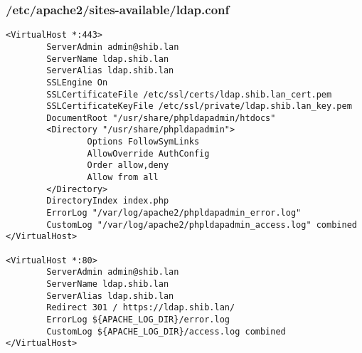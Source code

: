 \subsubsection{/etc/apache2/sites-available/ldap.conf}
\begin{lstlisting}
<VirtualHost *:443>
        ServerAdmin admin@shib.lan
        ServerName ldap.shib.lan
        ServerAlias ldap.shib.lan
        SSLEngine On
        SSLCertificateFile /etc/ssl/certs/ldap.shib.lan_cert.pem
        SSLCertificateKeyFile /etc/ssl/private/ldap.shib.lan_key.pem
        DocumentRoot "/usr/share/phpldapadmin/htdocs"
        <Directory "/usr/share/phpldapadmin">
                Options FollowSymLinks
                AllowOverride AuthConfig
                Order allow,deny
                Allow from all
        </Directory>
        DirectoryIndex index.php
        ErrorLog "/var/log/apache2/phpldapadmin_error.log"
        CustomLog "/var/log/apache2/phpldapadmin_access.log" combined
</VirtualHost>

<VirtualHost *:80>
        ServerAdmin admin@shib.lan
        ServerName ldap.shib.lan
        ServerAlias ldap.shib.lan
        Redirect 301 / https://ldap.shib.lan/
        ErrorLog ${APACHE_LOG_DIR}/error.log
        CustomLog ${APACHE_LOG_DIR}/access.log combined
</VirtualHost>
\end{lstlisting}

